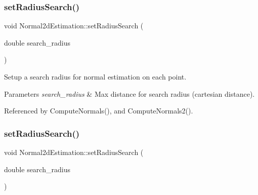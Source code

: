 \subsubsection{\texorpdfstring{set\+Radius\+Search()}{setRadiusSearch()}\hspace{0.1cm}{\footnotesize\ttfamily [1/2]}}
{\footnotesize\ttfamily void Normal2d\+Estimation\+::set\+Radius\+Search (\begin{DoxyParamCaption}\item[{double}]{search\+\_\+radius }\end{DoxyParamCaption})\hspace{0.3cm}{\ttfamily [inline]}}



Setup a search radius for normal estimation on each point. 


\begin{DoxyParams}{Parameters}
{\em search\+\_\+radius} & Max distance for search radius (cartesian distance). \\
\hline
\end{DoxyParams}


Referenced by Compute\+Normals(), and Compute\+Normals2().

\mbox{\label{classNormal2dEstimation_aebdbc9d5d5cabd269522f42af9d1552f}} 
\subsubsection{\texorpdfstring{set\+Radius\+Search()}{setRadiusSearch()}\hspace{0.1cm}{\footnotesize\ttfamily [2/2]}}
{\footnotesize\ttfamily void Normal2d\+Estimation\+::set\+Radius\+Search (\begin{DoxyParamCaption}\item[{double}]{search\+\_\+radius }\end{DoxyParamCaption})\hspace{0.3cm}{\ttfamily [inline]}}

\mbox{\label{classNormal2dEstimation_a87261649c17ea4f561da89066591a900}} 
